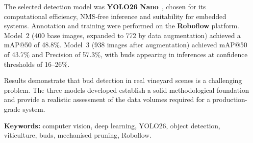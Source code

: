 The selected detection model was \textbf{YOLO26 Nano}~\cite{hidayatullah2026yolo26},
chosen for its computational efficiency, NMS-free inference and suitability
for embedded systems. Annotation and training were performed on the
\textbf{Roboflow} platform. Model~2 (400 base images, expanded to 772 by
data augmentation) achieved a mAP@50 of 48.8\%. Model~3 (938 images after
augmentation) achieved mAP@50 of 43.7\% and Precision of 57.3\%, with buds
appearing in inferences at confidence thresholds of 16--26\%.

Results demonstrate that bud detection in real vineyard scenes is a
challenging problem. The three models developed establish a solid methodological
foundation and provide a realistic assessment of the data volumes required
for a production-grade system.

\vspace{1em}
\noindent\textbf{Keywords:} computer vision, deep learning, YOLO26, object
detection, viticulture, buds, mechanised pruning, Roboflow.

\clearpage
